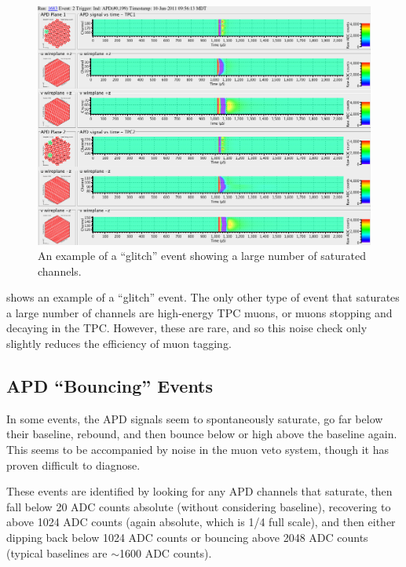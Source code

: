 \documentclass[herrin-thesis.tex]{subfiles}
\begin{document}
\begin{figure}[tbp]
\centering
\includegraphics[width=\columnwidth]{./plots/noise_eventdisplay_run_1683_ev_0002.png}
\caption[``Glitch'' noise]{An example of a ``glitch'' event showing a large number of saturated channels.}
\label{fig:noise_glitch}
\end{figure}

 shows an example of a ``glitch'' event. The only other type of event that saturates a large number of channels are high-energy TPC muons, or  muons stopping and decaying in the TPC. However, these are rare, and so this noise check only slightly reduces the efficiency of muon tagging.

\subsection{APD ``Bouncing'' Events}
In some events, the APD signals seem to spontaneously saturate, go far below their baseline, rebound, and then bounce below or high above the baseline again. This seems to be accompanied by noise in the muon veto system, though it has proven difficult to diagnose.

These events are identified by looking for any APD channels that saturate, then fall below 20 ADC counts absolute (without considering baseline), recovering to above 1024 ADC counts (again absolute, which is 1/4 full scale), and then either dipping back below 1024 ADC counts or bouncing above 2048 ADC counts (typical baselines are \(\sim\)1600 ADC counts). 
\end{document}
